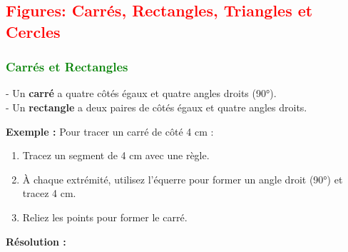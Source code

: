 \documentclass{article}
\begin{document}
\vspace{0.5cm}

\subsection{\textcolor{red}{Figures: Carrés, Rectangles, Triangles et Cercles}}

\subsubsection{\textcolor{green}{Carrés et Rectangles}}

\begin{tcolorbox}[colback=red!10!white, colframe=red!75!black, title=\textcolor{white}{Définitions}, sharp corners=south]
    - Un \textbf{carré} a quatre côtés égaux et quatre angles droits (90°). \\
    - Un \textbf{rectangle} a deux paires de côtés égaux et quatre angles droits.
\end{tcolorbox}

\vspace{0.2cm}

\begin{tcolorbox}[colback=orange!10!white, colframe=orange!75!black, title=\textcolor{white}{Exemple de traçage}, sharp corners=south]
    \textbf{Exemple :} Pour tracer un carré de côté 4 cm :
    \begin{enumerate}
        \item Tracez un segment de 4 cm avec une règle.
        \item À chaque extrémité, utilisez l'équerre pour former un angle droit (90°) et tracez 4 cm.
        \item Reliez les points pour former le carré.
    \end{enumerate}
\end{tcolorbox}

\textbf{Résolution :}
\end{document}
